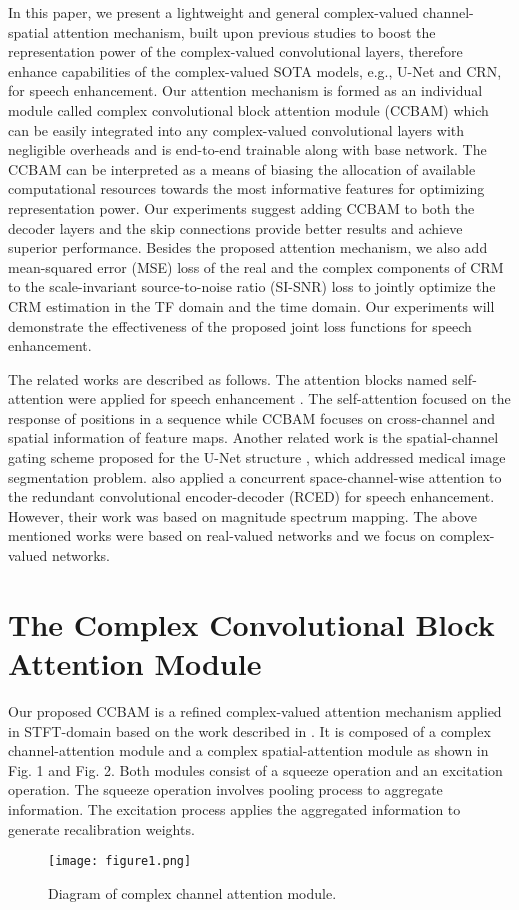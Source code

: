 \documentclass{article}
\begin{document}
In this paper, we present a lightweight and general complex-valued channel-spatial attention mechanism, built upon previous studies \cite{Woo2018} to boost the representation power of the complex-valued convolutional layers, therefore enhance capabilities of the complex-valued SOTA models, e.g., U-Net and CRN, for speech enhancement. Our attention mechanism is formed as an individual module called complex convolutional block attention module (CCBAM) which can be easily integrated into any complex-valued convolutional layers with negligible overheads and is end-to-end trainable along with base network. The CCBAM can be interpreted as a means of biasing the allocation of available computational resources towards the most informative features for optimizing representation power. Our experiments suggest adding CCBAM to both the decoder layers and the skip connections provide better results and achieve superior performance. Besides the proposed attention mechanism, we also add mean-squared error (MSE) loss of the real and the complex components of CRM to the scale-invariant source-to-noise ratio (SI-SNR) loss \cite{Choi2019, Hu2020} to jointly optimize the CRM estimation in the TF domain and the time domain. Our experiments will demonstrate the effectiveness of the proposed joint loss functions for speech enhancement.

The related works are described as follows. The attention blocks named self-attention were applied for speech enhancement \cite{Isik2020, Koizumi2020}. The self-attention focused on the response of positions in a sequence while CCBAM focuses on cross-channel and spatial information of feature maps. Another related work is the spatial-channel gating scheme proposed for the U-Net structure \cite{Khanh2019}, which addressed medical image segmentation problem. \cite{Lan2020} also applied a concurrent space-channel-wise attention to the redundant convolutional encoder-decoder (RCED) for speech enhancement. However, their work was based on magnitude spectrum mapping. The above mentioned works were based on real-valued networks and we focus on complex-valued networks.

\section{The Complex Convolutional Block Attention Module}
\label{sec:format}


Our proposed CCBAM is a refined complex-valued attention mechanism applied in STFT-domain based on the work described in \cite{Woo2018}. It is composed of a complex channel-attention module and a complex spatial-attention module as shown in Fig. 1 and Fig. 2. Both modules consist of a squeeze operation and an excitation operation. The squeeze operation involves pooling process to aggregate information. The excitation process applies the aggregated information to generate recalibration weights.
\begin{figure}[t]
  \centering
  \texttt{[image: figure1.png]}
  \caption{Diagram of complex channel attention module.}
  \label{fig1}
\end{figure}
\end{document}
